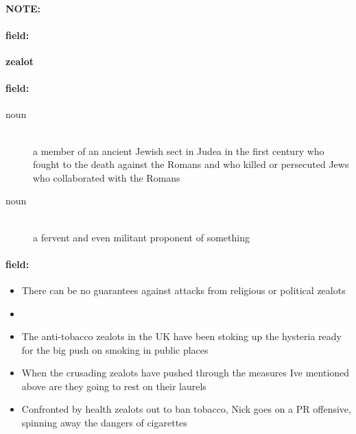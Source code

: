 \documentclass[12pt]{article}
\newenvironment{note}{\paragraph{NOTE:}}{}
\newenvironment{field}{\paragraph{field:}}{}
\begin{document}
\begin{note}
\begin{field}
\textbf{\large zealot}
\end{field}


\begin{field}
\begin{description}
\item[noun] \hfill \\ 
a member of an ancient Jewish sect in Judea in the first century who fought to the death against the Romans and who killed or persecuted Jews who collaborated with the Romans

\item[noun] \hfill \\ 
a fervent and even militant proponent of something

\end{description}
\end{field}

\begin{field}
\begin{itemize}
\item There can be no guarantees against attacks from religious or political zealots
\item 
\item The anti-tobacco zealots in the UK have been stoking up the hysteria ready for the big push on smoking in public places
\item When the crusading zealots have pushed through the measures Ive mentioned above are they going to rest on their laurels
\item Confronted by health zealots out to ban tobacco, Nick goes on a PR offensive, spinning away the dangers of cigarettes
\end{itemize}
\end{field}
\end{note}
\end{document}
